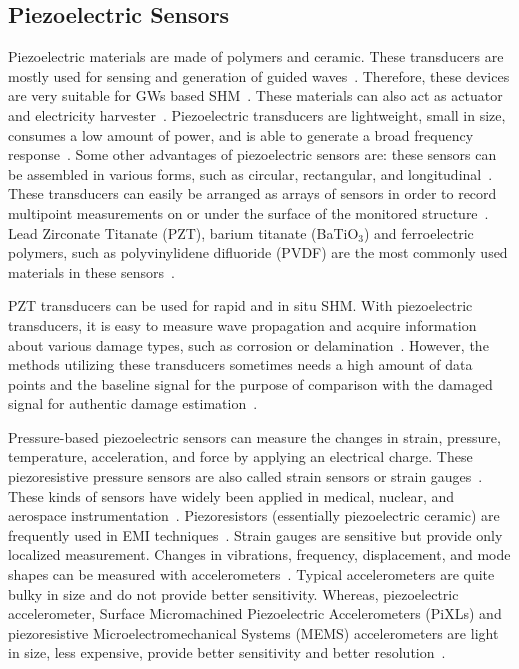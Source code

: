 \documentclass[b5paper, 11pt, titlepage]{book}
\begin{document}
\subsection{Piezoelectric Sensors}
Piezoelectric materials are made of polymers and ceramic. These transducers are mostly used for sensing and generation of guided waves~\cite{dimitriadis1991piezoelectric, Schulz1999, Badcock2000, thomas2017structural}. Therefore, these devices are very suitable for GWs based SHM~\cite{stepinski2013advanced}. These materials can also act as actuator and electricity harvester~\cite{Anton2007}. Piezoelectric transducers are lightweight, small in size, consumes a low amount of power, and is able to generate a broad frequency response~\cite{stepinski2013advanced, su2009identification}. Some other advantages of piezoelectric sensors are: these sensors can be assembled in various forms, such as circular, rectangular, and longitudinal~\cite{stepinski2013advanced, TibaduizaBurgos2020}. These transducers can easily be arranged as arrays of sensors in order to record multipoint measurements on or under the surface of the monitored structure~\cite{Stavroulakis2013}. 
Lead Zirconate Titanate (PZT), barium titanate (BaTiO$_3$) and ferroelectric polymers, such as polyvinylidene difluoride (PVDF) are the most commonly used materials in these sensors~\cite{kkedziora2013piezoelectric}.

PZT transducers can be used for rapid and in situ SHM. With piezoelectric transducers, it is easy to measure wave propagation and acquire information about various damage types, such as corrosion or delamination~\cite{TibaduizaBurgos2020,Mitra2016}. However, the methods utilizing these transducers sometimes needs a high amount of data points and the baseline signal for the purpose of comparison with the damaged signal for authentic damage estimation~\cite{Farrar2012,Hameed2019}.

Pressure-based piezoelectric sensors can measure the changes in strain, pressure, temperature, acceleration, and force by applying an electrical charge. These piezoresistive pressure sensors are also called strain sensors or strain gauges~\cite{Das2018, Sikarwar2017}. These kinds of sensors have widely  been applied in medical, nuclear, and aerospace instrumentation~\cite{Sikarwar2017}. Piezoresistors (essentially piezoelectric ceramic) are frequently used in EMI techniques~\cite{TibaduizaBurgos2020, jawaid2018structural}. Strain gauges are sensitive but provide only localized measurement. Changes in vibrations, frequency, displacement, and mode shapes can be measured with accelerometers~\cite{Salawu1997}. Typical accelerometers are quite bulky in size and do not provide better sensitivity. Whereas, piezoelectric accelerometer,  Surface Micromachined Piezoelectric Accelerometers (PiXLs) and piezoresistive Microelectromechanical Systems (MEMS) accelerometers are light in size, less expensive, provide  better sensitivity and better resolution~\cite{Das2018, Nemirovsky1996, DeVoe2001, Sabato2017}.    
\end{document}
